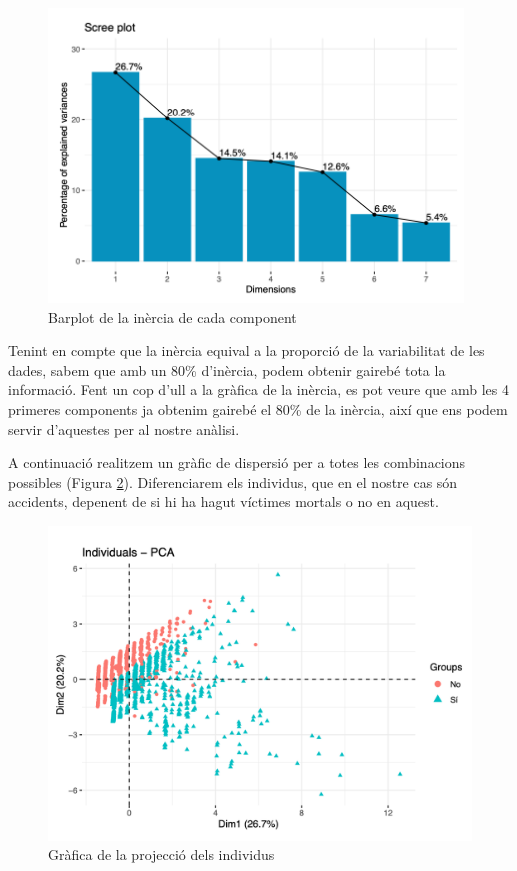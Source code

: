\documentclass[12pt,longbibliography]{article}
\theoremstyle{definition}
\theoremstyle{remark}
\begin{document}
\begin{figure}[H]
\begin{center}
\includegraphics[width=11cm]{acp2}
\end{center}
\caption{Barplot de la inèrcia de cada component}
\label{fig:ACP2}
\end{figure}


Tenint en compte que la inèrcia equival a la proporció de la variabilitat de les dades, sabem que amb un 80\% d'inèrcia, podem obtenir gairebé tota la informació. Fent un cop d'ull a la gràfica de la inèrcia, es pot veure que amb les 4 primeres components ja obtenim gairebé el 80\% de la inèrcia, així que ens podem servir d'aquestes per al nostre anàlisi.



A continuació realitzem un gràfic de dispersió per a totes les combinacions possibles (Figura \ref{fig:ACP3}). Diferenciarem els individus, que en el nostre cas són accidents, depenent de si hi ha hagut víctimes mortals o no en aquest. 

\begin{figure}[H]
\begin{center}
\includegraphics[width=15cm]{acp3}
\end{center}
\caption{Gràfica de la projecció dels individus}
\label{fig:ACP3}
\end{figure}
\end{document}
